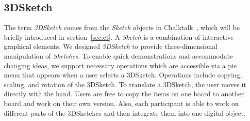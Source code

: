 \documentclass[chi_draft]{sigchi}
\begin{document}
\subsection{3DSketch} \label{3dsketch}
The term \textit{3DSketch} comes from the \textit{Sketch} objects in Chalktalk~\cite{perlin2018chalktalk}, which will be briefly introduced in section~\ref{sec:ct}. A \textit{Sketch} is a combination of interactive graphical elements. We designed \textit{3DSketch} to provide three-dimensional manipulation of \textit{Sketches}. To enable quick demonstrations and accommodate changing ideas, we support necessary operations which are accessible via a pie menu that appears when a user selects a 3DSketch. Operations include copying, scaling, and rotation of the 3DSketch. To translate a 3DSketch, the user moves it directly with the hand. Users are free to copy the items on one board to another board and work on their own version. Also, each participant is able to work on different parts of the 3DSketches and then integrate them into one digital object. 
\end{document}
